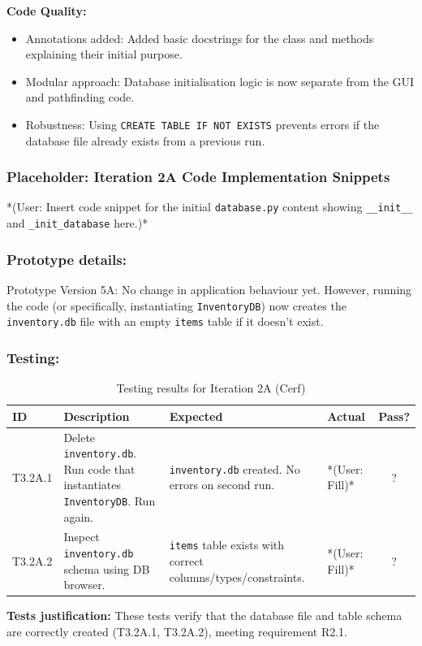 \textbf{Code Quality:}
\begin{itemize}
	\item Annotations added: Added basic docstrings for the class and methods explaining their initial purpose.
	\item Modular approach: Database initialisation logic is now separate from the GUI and pathfinding code.
	\item Robustness: Using \verb|CREATE TABLE IF NOT EXISTS| prevents errors if the database file already exists from a previous run.
\end{itemize}

\newpage
\subsubsection*{Placeholder: Iteration 2A Code Implementation Snippets}
*(User: Insert code snippet for the initial \verb|database.py| content showing \verb|__init__| and \verb|_init_database| here.)*
\newpage

\subsubsection{Prototype details:}
Prototype Version 5A: No change in application behaviour yet. However, running the code (or specifically, instantiating \verb|InventoryDB|) now creates the \verb|inventory.db| file with an empty \verb|items| table if it doesn't exist.

\subsubsection{Testing:}
\begin{table}[htbp]
	\centering
	\begin{tabularx}{\textwidth}{|l|X|p{4.5cm}|p{1.5cm}|c|}
		\hline
		\textbf{ID} & \textbf{Description} & \textbf{Expected} & \textbf{Actual} & \textbf{Pass?} \\
		\hline
		T3.2A.1 & Delete \verb|inventory.db|. Run code that instantiates \verb|InventoryDB|. Run again. & \verb|inventory.db| created. No errors on second run. & *(User: Fill)* & ? \\
		\hline
		T3.2A.2 & Inspect \verb|inventory.db| schema using DB browser. & \verb|items| table exists with correct columns/types/constraints. & *(User: Fill)* & ? \\
		\hline
	\end{tabularx}
	\caption{Testing results for Iteration 2A (Cerf)}
\end{table}
\textbf{Tests justification:} These tests verify that the database file and table schema are correctly created (T3.2A.1, T3.2A.2), meeting requirement R2.1.

